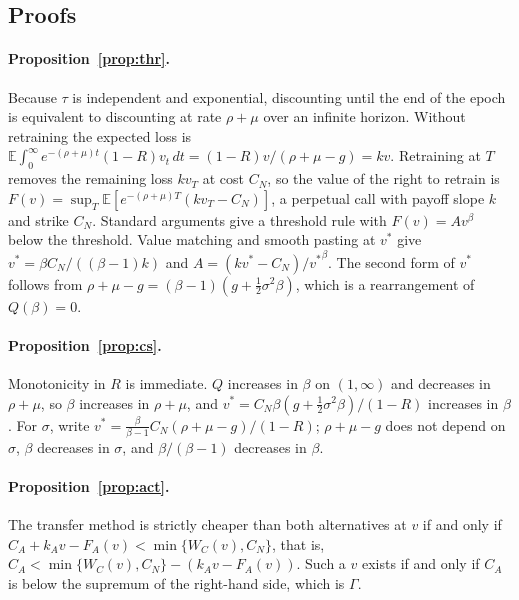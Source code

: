 \documentclass[ijds,blindrev]{informs4}
\newcommand{\E}{\mathbb{E}}
\begin{document}
\begin{APPENDICES}

\section{Proofs}\label{app:proofs}

\paragraph{Proposition~\ref{prop:thr}.} Because $\tau$ is independent and exponential, discounting until the end of the epoch is equivalent to discounting at rate $\rho+\mu$ over an infinite horizon. Without retraining the expected loss is $\E\int_0^\infty e^{-(\rho+\mu)t}(1-R)v_t\,dt=(1-R)v/(\rho+\mu-g)=kv$. Retraining at $T$ removes the remaining loss $kv_T$ at cost $C_N$, so the value of the right to retrain is $F(v)=\sup_T\E[e^{-(\rho+\mu)T}(kv_T-C_N)]$, a perpetual call with payoff slope $k$ and strike $C_N$. Standard arguments \citep{dixit1994investment} give a threshold rule with $F(v)=Av^\beta$ below the threshold. Value matching and smooth pasting at $v^*$ give $v^*=\beta C_N/((\beta-1)k)$ and $A=(kv^*-C_N)/{v^*}^\beta$. The second form of $v^*$ follows from $\rho+\mu-g=(\beta-1)(g+\tfrac12\sigma^2\beta)$, which is a rearrangement of $Q(\beta)=0$.

\paragraph{Proposition~\ref{prop:cs}.} Monotonicity in $R$ is immediate. $Q$ increases in $\beta$ on $(1,\infty)$ and decreases in $\rho+\mu$, so $\beta$ increases in $\rho+\mu$, and $v^*=C_N\beta(g+\tfrac12\sigma^2\beta)/(1-R)$ increases in $\beta$. For $\sigma$, write $v^*=\frac{\beta}{\beta-1}C_N(\rho+\mu-g)/(1-R)$; $\rho+\mu-g$ does not depend on $\sigma$, $\beta$ decreases in $\sigma$, and $\beta/(\beta-1)$ decreases in $\beta$.

\paragraph{Proposition~\ref{prop:act}.} The transfer method is strictly cheaper than both alternatives at $v$ if and only if $C_A+k_Av-F_A(v)<\min\{W_C(v),C_N\}$, that is, $C_A<\min\{W_C(v),C_N\}-(k_Av-F_A(v))$. Such a $v$ exists if and only if $C_A$ is below the supremum of the right-hand side, which is $\Gamma$.


\end{APPENDICES}
\end{document}

